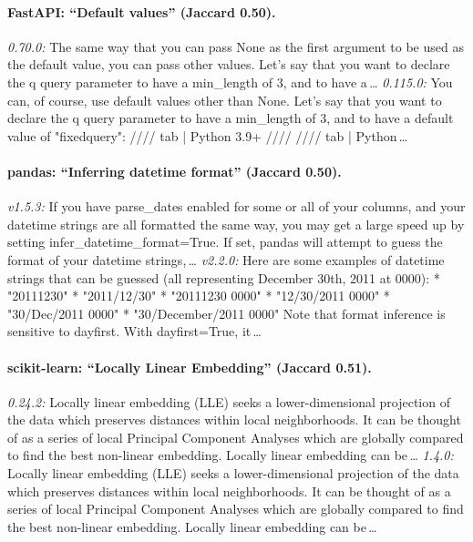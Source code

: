 \paragraph{FastAPI: ``Default values'' (Jaccard 0.50).} \emph{0.70.0:} The same way that you can pass None as the first argument to be used as the default value, you can pass other values. Let's say that you want to declare the q query parameter to have a min\_length of 3, and to have a\,\dots{} \emph{0.115.0:} You can, of course, use default values other than None. Let's say that you want to declare the q query parameter to have a min\_length of 3, and to have a default value of "fixedquery": //// tab | Python 3.9+ //// //// tab | Python\,\dots

\paragraph{pandas: ``Inferring datetime format'' (Jaccard 0.50).} \emph{v1.5.3:} If you have parse\_dates enabled for some or all of your columns, and your datetime strings are all formatted the same way, you may get a large speed up by setting infer\_datetime\_format=True. If set, pandas will attempt to guess the format of your datetime strings,\,\dots{} \emph{v2.2.0:} Here are some examples of datetime strings that can be guessed (all representing December 30th, 2011 at 0000): * "20111230" * "2011/12/30" * "20111230 0000" * "12/30/2011 0000" * "30/Dec/2011 0000" * "30/December/2011 0000" Note that format inference is sensitive to dayfirst. With dayfirst=True, it\,\dots

\paragraph{scikit-learn: ``Locally Linear Embedding'' (Jaccard 0.51).} \emph{0.24.2:} Locally linear embedding (LLE) seeks a lower-dimensional projection of the data which preserves distances within local neighborhoods. It can be thought of as a series of local Principal Component Analyses which are globally compared to find the best non-linear embedding. Locally linear embedding can be\,\dots{} \emph{1.4.0:} Locally linear embedding (LLE) seeks a lower-dimensional projection of the data which preserves distances within local neighborhoods. It can be thought of as a series of local Principal Component Analyses which are globally compared to find the best non-linear embedding. Locally linear embedding can be\,\dots

